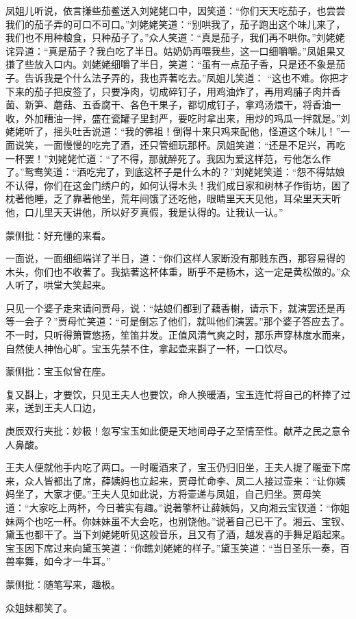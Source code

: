 \begin{parag}
凤姐儿听说，依言搛些茄鲝送入刘姥姥口中，因笑道：“你们天天吃茄子，也尝尝我们的茄子弄的可口不可口。”刘姥姥笑道：“别哄我了，茄子跑出这个味儿来了，我们也不用种粮食，只种茄子了。”众人笑道：“真是茄子，我们再不哄你。”刘姥姥诧异道：“真是茄子？我白吃了半日。姑奶奶再喂我些，这一口细嚼嚼。”凤姐果又搛了些放入口内。刘姥姥细嚼了半日，笑道：“虽有一点茄子香，只是还不象是茄子。告诉我是个什么法子弄的，我也弄著吃去。”凤姐儿笑道： “这也不难。你把才下来的茄子把皮签了，只要净肉，切成碎钉子，用鸡油炸了，再用鸡脯子肉并香菌、新笋、蘑菇、五香腐干、各色干果子，都切成钉子，拿鸡汤煨干，将香油一收，外加糟油一拌，盛在瓷罐子里封严，要吃时拿出来，用炒的鸡瓜一拌就是。”刘姥姥听了，摇头吐舌说道：“我的佛祖！倒得十来只鸡来配他，怪道这个味儿！”一面说笑，一面慢慢的吃完了酒，还只管细玩那杯。凤姐笑道：“还是不足兴，再吃一杯罢！”刘姥姥忙道：“了不得，那就醉死了。我因为爱这样范，亏他怎么作了。”鸳鸯笑道：“酒吃完了，到底这杯子是什么木的？”刘姥姥笑道：“怨不得姑娘不认得，你们在这金门绣户的，如何认得木头！我们成日家和树林子作街坊，困了枕著他睡，乏了靠著他坐，荒年间饿了还吃他，眼睛里天天见他，耳朵里天天听他，口儿里天天讲他，所以好歹真假，我是认得的。让我认一认。”\begin{note}蒙侧批：好充懂的来看。\end{note}一面说，一面细细端详了半日，道：“你们这样人家断没有那贱东西，那容易得的木头，你们也不收著了。我掂著这杯体重，断乎不是杨木，这一定是黄松做的。”众人听了，哄堂大笑起来。
\end{parag}


\begin{parag}


    只见一个婆子走来请问贾母，说：“姑娘们都到了藕香榭，请示下，就演罢还是再等一会子？”贾母忙笑道：“可是倒忘了他们，就叫他们演罢。”那个婆子答应去了。不一时，只听得箫管悠扬，笙笛并发。正值风清气爽之时，那乐声穿林度水而来，自然使人神怡心旷。宝玉先禁不住，拿起壶来斟了一杯，一口饮尽。\begin{note}蒙侧批：宝玉似曾在座。\end{note}复又斟上，才要饮，只见王夫人也要饮，命人换暖酒，宝玉连忙将自己的杯捧了过来，送到王夫人口边，\begin{note}庚辰双行夹批：妙极！忽写宝玉如此便是天地间母子之至情至性。献芹之民之意令人鼻酸。\end{note}王夫人便就他手内吃了两口。一时暖酒来了，宝玉仍归旧坐，王夫人提了暖壶下席来，众人皆都出了席，薛姨妈也立起来，贾母忙命李、凤二人接过壶来：“让你姨妈坐了，大家才便。”王夫人见如此说，方将壶递与凤姐，自己归坐。贾母笑道：“大家吃上两杯，今日著实有趣。”说著擎杯让薛姨妈，又向湘云宝钗道：“你姐妹两个也吃一杯。你妹妹虽不大会吃，也别饶他。”说著自己已干了。湘云、宝钗、黛玉也都干了。当下刘姥姥听见这般音乐，且又有了酒，越发喜的手舞足蹈起来。宝玉因下席过来向黛玉笑道：“你瞧刘姥姥的样子。”黛玉笑道：“当日圣乐一奏，百兽率舞，如今才一牛耳。”\begin{note}蒙侧批：随笔写来，趣极。\end{note}众姐妹都笑了。
\end{parag}


